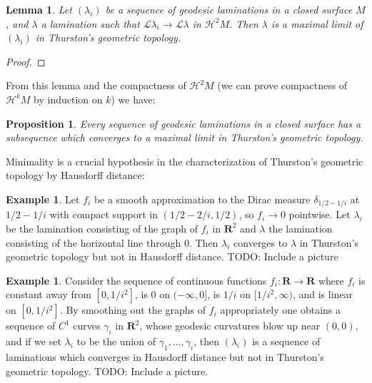 \documentclass[reqno,10pt]{amsart}
\newcommand{\RR}{\mathbf{R}}
\newcommand{\Leaves}{\mathscr L}
\newcommand{\Hypspace}{\mathscr H}
\newtheorem{lemma}[theorem]{Lemma}
\newtheorem{proposition}[theorem]{Proposition}
\theoremstyle{definition}
\newtheorem{example}[theorem]{Example}
\numberwithin{equation}{section}
\begin{document}
\begin{lemma}
Let $(\lambda_i)$ be a sequence of geodesic laminations in a closed surface $M$, and $\lambda$ a lamination such that $\Leaves \lambda_i \to \Leaves \lambda$ in $\Hypspace^2 M$.
Then $\lambda$ is a maximal limit of $(\lambda_i)$ in Thurston's geometric topology.
\end{lemma}
\begin{proof}

\end{proof}

From this lemma and the compactness of $\Hypspace^2 M$ (we can prove compactness of $\Hypspace^k M$ by induction on $k$) we have:

\begin{proposition}
Every sequence of geodesic laminations in a closed surface has a subsequence which converges to a maximal limit in Thurston's geometric topology.
\end{proposition}

Minimality is a crucial hypothesis in the characterization of Thurston's geometric topology by Hausdorff distance:

\begin{example}
Let $f_i$ be a smooth approximation to the Dirac measure $\delta_{1/2-1/i}$ at $1/2 - 1/i$ with compact support in $(1/2 - 2/i, 1/2)$, so $f_i \to 0$ pointwise.
Let $\lambda_i$ be the lamination consisting of the graph of $f_i$ in $\RR^2$ and $\lambda$ the lamination consisting of the horizontal line through $0$.
Then $\lambda_i$ converges to $\lambda$ in Thurston's geometric topology but not in Hausdorff distance.
TODO: Include a picture
\end{example}

\begin{example}\label{Hausdorff does not imply Thurston}
Consider the sequence of continuous functions $f_i: \RR \to \RR$ where $f_i$ is constant away from $[0, 1/i^2]$, is $0$ on $(-\infty, 0]$, is $1/i$ on $[1/i^2, \infty)$, and is linear on $[0, 1/i^2]$.
By smoothing out the graphs of $f_i$ appropriately one obtains a sequence of $C^1$ curves $\gamma_i$ in $\RR^2$, whose geodesic curvatures blow up near $(0, 0)$, and if we set $\lambda_i$ to be the union of $\gamma_1, \dots, \gamma_i$, then $(\lambda_i)$ is a sequence of laminations which converges in Hausdorff distance but not in Thurston's geometric topology.
TODO: Include a picture.
\end{example}

\end{document}

